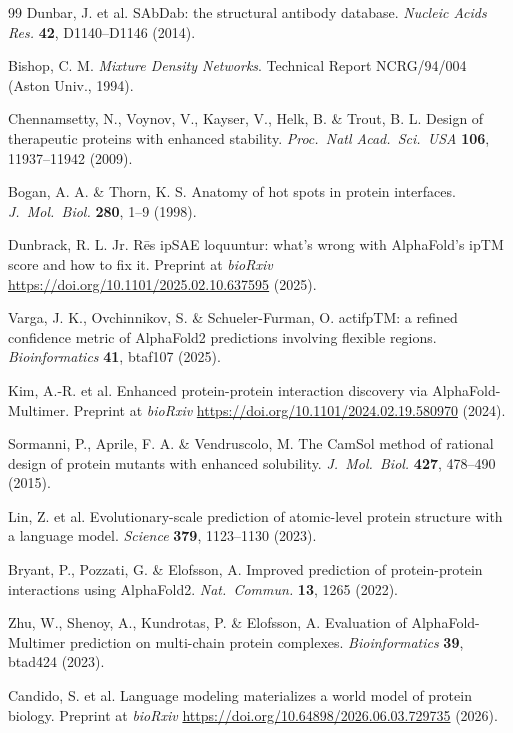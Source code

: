 \documentclass[10pt,twocolumn]{article}
\begin{document}
\begin{thebibliography}{99}
Dunbar, J. et al. SAbDab: the structural antibody database. \textit{Nucleic Acids Res.} \textbf{42}, D1140--D1146 (2014).

Bishop, C. M. \textit{Mixture Density Networks}. Technical Report NCRG/94/004 (Aston Univ., 1994).

Chennamsetty, N., Voynov, V., Kayser, V., Helk, B. \& Trout, B. L. Design of therapeutic proteins with enhanced stability. \textit{Proc.\ Natl Acad.\ Sci.\ USA} \textbf{106}, 11937--11942 (2009).

Bogan, A. A. \& Thorn, K. S. Anatomy of hot spots in protein interfaces. \textit{J.\ Mol.\ Biol.} \textbf{280}, 1--9 (1998).

Dunbrack, R. L. Jr. R{\=e}s ipSAE loquuntur: what's wrong with AlphaFold's ipTM score and how to fix it. Preprint at \textit{bioRxiv} \url{https://doi.org/10.1101/2025.02.10.637595} (2025).

Varga, J. K., Ovchinnikov, S. \& Schueler-Furman, O. actifpTM: a refined confidence metric of AlphaFold2 predictions involving flexible regions. \textit{Bioinformatics} \textbf{41}, btaf107 (2025).

Kim, A.-R. et al. Enhanced protein-protein interaction discovery via AlphaFold-Multimer. Preprint at \textit{bioRxiv} \url{https://doi.org/10.1101/2024.02.19.580970} (2024).

Sormanni, P., Aprile, F. A. \& Vendruscolo, M. The CamSol method of rational design of protein mutants with enhanced solubility. \textit{J.\ Mol.\ Biol.} \textbf{427}, 478--490 (2015).

Lin, Z. et al. Evolutionary-scale prediction of atomic-level protein structure with a language model. \textit{Science} \textbf{379}, 1123--1130 (2023).

Bryant, P., Pozzati, G. \& Elofsson, A. Improved prediction of protein-protein interactions using AlphaFold2. \textit{Nat.\ Commun.} \textbf{13}, 1265 (2022).

Zhu, W., Shenoy, A., Kundrotas, P. \& Elofsson, A. Evaluation of AlphaFold-Multimer prediction on multi-chain protein complexes. \textit{Bioinformatics} \textbf{39}, btad424 (2023).

Candido, S. et al. Language modeling materializes a world model of protein biology. Preprint at \textit{bioRxiv} \url{https://doi.org/10.64898/2026.06.03.729735} (2026).


\end{thebibliography}
\end{document}
